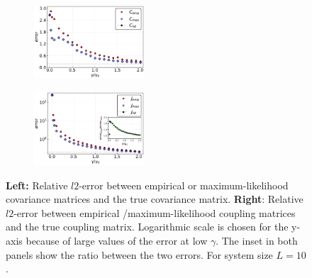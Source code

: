 \documentclass[preprint,amsmath,amssymb,superscriptaddress,showpacs,pre]{revtex4-1}
\begin{document}
 \begin{figure}[!htb]
 		\begin{subfigure}{}
 			\centering\includegraphics[keepaspectratio=true,width=0.45\textwidth]{Figures/epsilon_error_C_L10_balanced_tree_100.pdf}
 		\end{subfigure}
 		\hspace{1mm}
 		\begin{subfigure}{}
 			\centering\includegraphics[keepaspectratio=true,width=0.45\textwidth]{Figures/epsilon_error_J_L10_balanced_tree_100.pdf}
 		\end{subfigure}
 	\caption{\textbf{Left:} Relative $l2$-error between empirical or maximum-likelihood covariance matrices and the true covariance matrix. \textbf{Right}: Relative $l2$-error between empirical /maximum-likelihood coupling matrices and the true coupling matrix. Logarithmic scale is chosen for the y-axis because of large values of the error at low $\gamma$. The inset in both panels show the ratio between the two errors. For system size $L=10$.}
 	\label{fig:error_1_L10}
 \end{figure}
\end{document}
